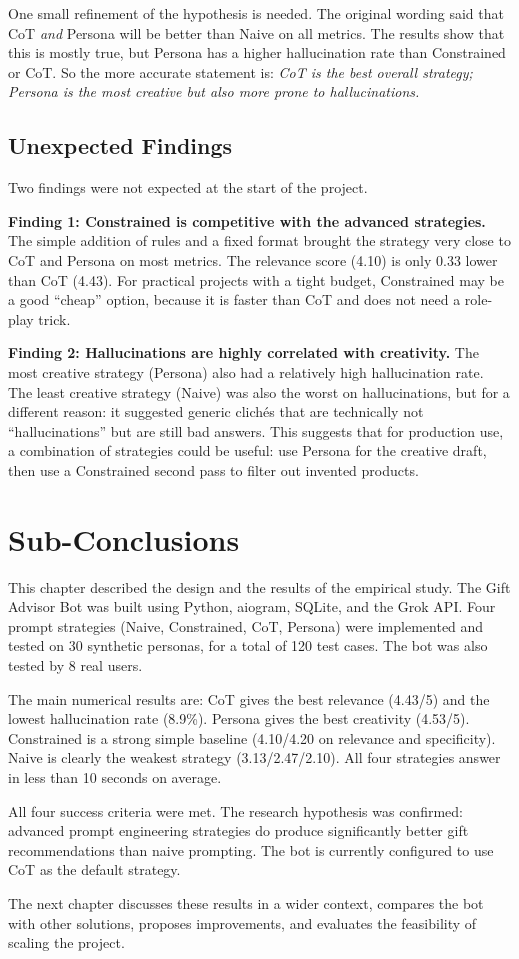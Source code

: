 One small refinement of the hypothesis is needed. The original wording said that CoT \textit{and} Persona will be better than Naive on all metrics. The results show that this is mostly true, but Persona has a higher hallucination rate than Constrained or CoT. So the more accurate statement is: \textit{CoT is the best overall strategy; Persona is the most creative but also more prone to hallucinations.}

\subsection{Unexpected Findings}

Two findings were not expected at the start of the project.

\textbf{Finding 1: Constrained is competitive with the advanced strategies.} The simple addition of rules and a fixed format brought the strategy very close to CoT and Persona on most metrics. The relevance score (4.10) is only 0.33 lower than CoT (4.43). For practical projects with a tight budget, Constrained may be a good ``cheap'' option, because it is faster than CoT and does not need a role-play trick.

\textbf{Finding 2: Hallucinations are highly correlated with creativity.} The most creative strategy (Persona) also had a relatively high hallucination rate. The least creative strategy (Naive) was also the worst on hallucinations, but for a different reason: it suggested generic clichés that are technically not ``hallucinations'' but are still bad answers. This suggests that for production use, a combination of strategies could be useful: use Persona for the creative draft, then use a Constrained second pass to filter out invented products.

\section{Sub-Conclusions}
\label{sec:ch3-summary}

This chapter described the design and the results of the empirical study. The Gift Advisor Bot was built using Python, aiogram, SQLite, and the Grok API. Four prompt strategies (Naive, Constrained, CoT, Persona) were implemented and tested on 30 synthetic personas, for a total of 120 test cases. The bot was also tested by 8 real users.

The main numerical results are: CoT gives the best relevance (4.43/5) and the lowest hallucination rate (8.9\%). Persona gives the best creativity (4.53/5). Constrained is a strong simple baseline (4.10/4.20 on relevance and specificity). Naive is clearly the weakest strategy (3.13/2.47/2.10). All four strategies answer in less than 10 seconds on average.

All four success criteria were met. The research hypothesis was confirmed: advanced prompt engineering strategies do produce significantly better gift recommendations than naive prompting. The bot is currently configured to use CoT as the default strategy.

The next chapter discusses these results in a wider context, compares the bot with other solutions, proposes improvements, and evaluates the feasibility of scaling the project.
